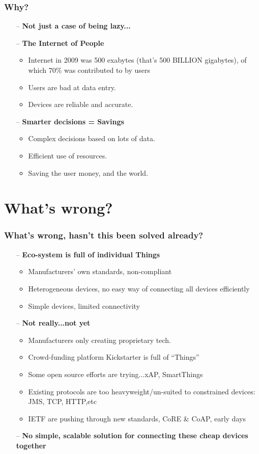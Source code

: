 \documentclass{beamer}
\begin{document}
\begin{frame}[t]\frametitle{Why?}
\begin{itemize}
  \item [--] \textbf{Not just a case of being lazy...}
  \item [--] \textbf{The Internet of People}
\begin{itemize}
  \item Internet in 2009 was 500 exabytes (that's 500 BILLION gigabytes), of which 70\% was contributed to by users
  \item Users are bad at data entry.
  \item Devices are reliable and accurate.
\end{itemize}
\item [--] \textbf{Smarter decisions = Savings}
  \begin{itemize}
    \item Complex decisions based on lots of data.
    \item Efficient use of resources.
    \item Saving the user money, and the world.
  \end{itemize}
\end{itemize}
\end{frame}


\section{What's wrong?} %
\begin{frame}[t]\frametitle{What's wrong, hasn't this been solved already?}
\label{sec:what_s_wrong_}
\begin{itemize}
  \item [--] \textbf{Eco-system is full of individual Things}
  \begin{itemize}
    \item Manufacturers' own standards, non-compliant
    \item Heterogeneous devices, no easy way of connecting all devices efficiently
    \item Simple devices, limited connectivity
  \end{itemize}
\item [--] \textbf{Not really...not yet}
  \begin{itemize}
    \item Manufacturers only creating proprietary tech.
    \item Crowd-funding platform Kickstarter is full of ``Things''
    \item Some open source efforts are trying...xAP, SmartThings
    \item Existing protocols are too heavyweight/un-suited to constrained devices: JMS, TCP, HTTP,etc
    \item IETF are pushing through new standards, CoRE \& CoAP, early days
  \end{itemize}
  \item [--] \textbf{No simple, scalable solution for connecting these cheap devices together}
\end{itemize}
\end{frame}
\end{document}
